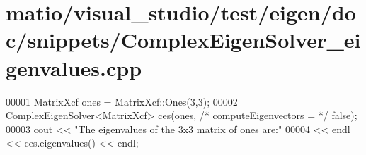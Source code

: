 \hypertarget{matio_2visual__studio_2test_2eigen_2doc_2snippets_2_complex_eigen_solver__eigenvalues_8cpp_source}{}\section{matio/visual\+\_\+studio/test/eigen/doc/snippets/\+Complex\+Eigen\+Solver\+\_\+eigenvalues.cpp}
\label{matio_2visual__studio_2test_2eigen_2doc_2snippets_2_complex_eigen_solver__eigenvalues_8cpp_source}

\begin{DoxyCode}
00001 MatrixXcf ones = MatrixXcf::Ones(3,3);
00002 ComplexEigenSolver<MatrixXcf> ces(ones, \textcolor{comment}{/* computeEigenvectors = */} \textcolor{keyword}{false});
00003 cout << \textcolor{stringliteral}{"The eigenvalues of the 3x3 matrix of ones are:"} 
00004      << endl << ces.eigenvalues() << endl;
\end{DoxyCode}
